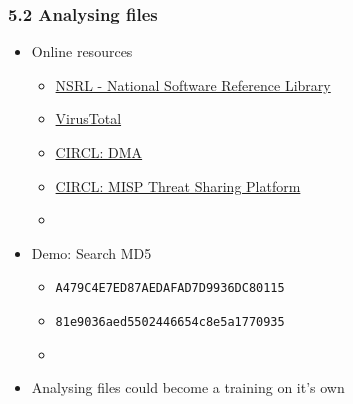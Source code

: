 \begin{frame}[fragile]
  \frametitle{5.2 Analysing files}
    \begin{itemize}
       \item Online resources
            \begin{itemize}
                \item[] \href{https://www.nist.gov/software-quality-group/national-software-reference-library-nsrl}{NSRL - National Software Reference Library}
                \item[] \href{https://www.virustotal.com/}{VirusTotal}
                \item[] \href{https://www.circl.lu/services/dynamic-malware-analysis/}{CIRCL: DMA}
                \item[] \href{https://www.circl.lu/services/misp-malware-information-sharing-platform/}{CIRCL: MISP Threat Sharing Platform}
                \item[]
            \end{itemize}
       \item Demo: Search MD5
            \begin{itemize}
                \item[] \texttt{A479C4E7ED87AEDAFAD7D9936DC80115}
                \item[] \texttt{81e9036aed5502446654c8e5a1770935}
                \item[] 
            \end{itemize}
       \item Analysing files could become a training on it's own
    \end{itemize}
\end{frame}




